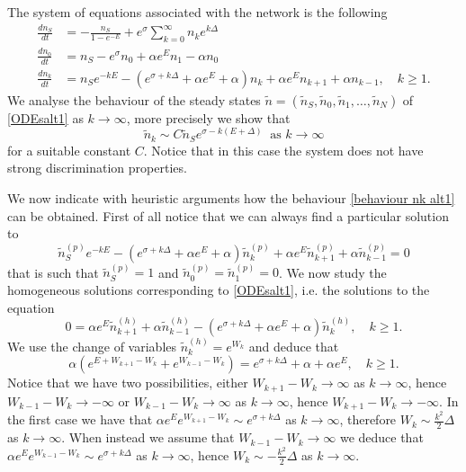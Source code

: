 \documentclass{article}
\numberwithin{equation}{section}
\theoremstyle{plain}
\begin{document}
The system of equations associated with the network is the following 
\begin{align}\label{ODEsalt1}
    \frac{d n_S }{dt} &= - \frac{n_S}{1-e^{-E}} + e^{\sigma }  \sum_{k=0}^{\infty} n_k e^{k \Delta } \nonumber \\
    \frac{d n_0 }{dt} &= n_S  - e^{\sigma } n_0 + \alpha e^E n_1 - \alpha  n_0 \nonumber \\
        \frac{d n_k }{dt} &= n_S e^{- k E} - \left( e^{\sigma + k \Delta } + \alpha e^E + \alpha \right)  n_k + \alpha e^E n_{k+1}  + \alpha  n_{k-1} , \quad k \geq 1. 
\end{align}
We analyse the behaviour of the steady states $\tilde{n} =(\tilde{n}_S, \tilde{n}_0, \tilde{n}_1, \dots, \tilde{n}_N )$ of \eqref{ODEsalt1} as $k \to \infty $, more precisely we show that 
\begin{equation} \label{behaviour nk alt1}
\tilde{n}_k \sim C \tilde{n}_S e^{\sigma - k(E+\Delta)  } \  \text{ as } k \to \infty 
\end{equation}
for a suitable constant $C$. Notice that in this case the system does not have strong discrimination properties. 

We now indicate with heuristic arguments how the behaviour \eqref{behaviour nk alt1} can be obtained. First of all notice that we can always find a particular solution to 
\[ 
\tilde{n}^{(p)}_S e^{- k E} - \left( e^{\sigma + k \Delta } + \alpha e^E + \alpha  \right)  \tilde{n}_k^{(p)} + \alpha e^E \tilde{n}_{k+1}^{(p)}  + \alpha  \tilde{n}_{k-1}^{(p)} =0
\]
that is such that $\tilde{n}^{(p)}_S=1$ and $\tilde{n}_{0}^{(p)} = \tilde{n}_{1}^{(p)} =0$. 
We now study the homogeneous solutions corresponding to \eqref{ODEsalt1}, i.e. the solutions to the equation 
\begin{equation} \label{hom alt12}
0=  \alpha e^E \tilde{n}_{k+1}^{(h)}  + \alpha  \tilde{n}_{k-1}^{(h)} - \left( e^{\sigma + k \Delta } + \alpha e^E + \alpha  \right)  \tilde{n}_k^{(h)}, \quad k \geq 1. 
\end{equation}
We use the change of variables $\tilde{n}_k^{(h)} = e^{W_k} $ and deduce that 
\begin{equation} \label{hom alt1}
\alpha \left( e^{E+ W_{k+1} - W_k}  +e^{W_{k-1} - W_k}   \right) = e^{\sigma + k \Delta}+ \alpha + \alpha e^E, \quad k \geq 1.
\end{equation}
Notice that we have two possibilities, either $W_{k+1}- W_k \rightarrow \infty $ as $k \to \infty $, hence $ W_{k-1} - W_k\rightarrow -  \infty $ or $W_{k-1}- W_k \rightarrow \infty $ as $k \to \infty $, hence $ W_{k+1} - W_k\rightarrow -  \infty $. In the first case we have that $\alpha e^E e^{W_{k+1}- W_k } \sim e^{\sigma + k \Delta}$ as $k \to \infty $, therefore $W_k \sim \frac{k^2}{2} \Delta $ as $k \to \infty $. When instead we assume that $ W_{k-1} - W_k\rightarrow  \infty $ we deduce that $\alpha e^E e^{W_{k-1}- W_k } \sim e^{\sigma + k \Delta}$ as $k \to \infty $, hence $W_k \sim - \frac{ k^2}{2} \Delta$ as $k \to \infty $. 
\end{document}
